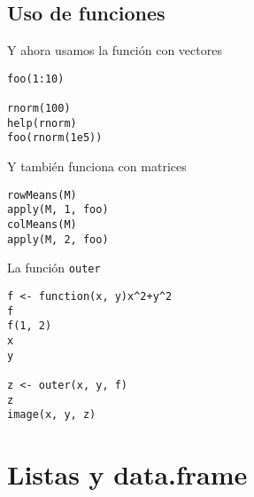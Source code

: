 \documentclass[xcolor={usenames,svgnames,dvipsnames}]{beamer}
\begin{document}
\subsection{Uso de funciones}
\label{sec-3-2}
\begin{frame}[fragile,label=sec-3-2-1]{Y ahora usamos la función con vectores}
 \lstset{language=R,numbers=none}
\begin{lstlisting}
foo(1:10)

rnorm(100)
help(rnorm)
foo(rnorm(1e5))
\end{lstlisting}
\end{frame}
\begin{frame}[fragile,label=sec-3-2-2]{Y también funciona con matrices}
 \lstset{language=R,numbers=none}
\begin{lstlisting}
rowMeans(M)
apply(M, 1, foo)
colMeans(M)
apply(M, 2, foo)
\end{lstlisting}
\end{frame}
\begin{frame}[fragile,label=sec-3-2-3]{La función \texttt{outer}}
 \lstset{language=R,numbers=none}
\begin{lstlisting}
f <- function(x, y)x^2+y^2
f
f(1, 2)
x
y

z <- outer(x, y, f)
z
image(x, y, z)
\end{lstlisting}
\end{frame}

\section{Listas y data.frame}
\label{sec-4}
\end{document}

